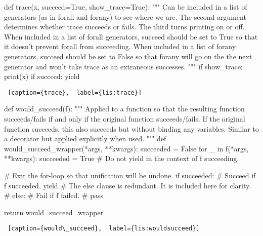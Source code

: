\begin{minipage}{\linewidth}  \largev \hrulefill
\begin{python}[numbers=left]
def trace(x, succeed=True, show_trace=True):
  """
  Can be included in a list of generators (as in forall and forany) to see where we are.
  The second argument determines whether trace succeeds or fails. The third turns printing on or off.
  When included in a list of forall generators, succeed should be set to True so that
  it doesn't prevent forall from succeeding.
  When included in a list of forany generators, succeed should be set to False so that forany
  will go on the the next generator and won't take trace as an extraneous successes.
  """
  if show_trace:
    print(x)
  if succeed:
    yield

\end{python}
\begin{lstlisting} [caption={trace},  label={lis:trace}]
\end{lstlisting}
\end{minipage}


\begin{minipage}{\linewidth}  \largev \hrulefill
\begin{python}[numbers=left]
def would_succeed(f):
  """
  Applied to a function so that the resulting function succeeds/fails if and only if the original
  function succeeds/fails. If the original function succeeds, this also succeeds but without 
  binding any variables. Similar to a decorator but applied explicitly when used.
  """
  def would_succeed_wrapper(*args, **kwargs):
    succeeded = False
    for _ in f(*args, **kwargs):
      succeeded = True
      # Do not yield in the context of f succeeding.
      
    # Exit the for-loop so that unification will be undone.
    if succeeded:
      # Succeed if f succeeded.
      yield  
    # The else clause is redundant. It is included here for clarity.
    # else:
    #   Fail if f failed.
    #   pass   

  return would_succeed_wrapper

\end{python}
\begin{lstlisting} [caption={would\_succeed},  label={lis:wouldsucceed}]
\end{lstlisting}
\end{minipage}
